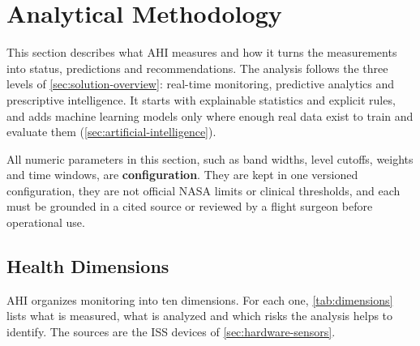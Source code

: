 \section{Analytical Methodology}
\label{sec:analytical-methodology}

This section describes what AHI measures and how it turns the measurements into status, predictions and recommendations. The analysis follows the three levels of \ref{sec:solution-overview}: real-time monitoring, predictive analytics and prescriptive intelligence. It starts with explainable statistics and explicit rules, and adds machine learning models only where enough real data exist to train and evaluate them (\ref{sec:artificial-intelligence}).

All numeric parameters in this section, such as band widths, level cutoffs, weights and time windows, are \textbf{configuration}. They are kept in one versioned configuration, they are not official NASA limits or clinical thresholds, and each must be grounded in a cited source or reviewed by a flight surgeon before operational use.

\subsection{Health Dimensions}
\label{subsec:dimensions}

AHI organizes monitoring into ten dimensions. For each one, \ref{tab:dimensions} lists what is measured, what is analyzed and which risks the analysis helps to identify. The sources are the ISS devices of \ref{sec:hardware-sensors}.


